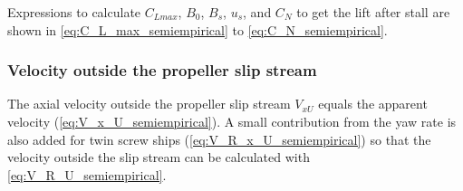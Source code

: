 Expressions to calculate $C_{Lmax}$, $B_0$, $B_s$, $u_s$, and $C_N$ to get the lift after stall are shown in \autoref{eq:C_L_max_semiempirical} to \autoref{eq:C_N_semiempirical}.
\begin{equation}
    \label{eq:C_L_max_semiempirical}
    
\end{equation}
%
\begin{equation}
    \label{eq:B_0_semiempirical}
    
\end{equation}
%
\begin{equation}
    \label{eq:B_s_semiempirical}
    
\end{equation}
%
\begin{equation}
    \label{eq:u_s_semiempirical}
    
\end{equation}
%
\begin{equation}
    \label{eq:C_N_semiempirical}
    
\end{equation}
%
%
\subsubsection{Velocity outside the propeller slip stream}
\label{sec:propeller_uncovered}
The axial velocity outside the propeller slip stream $V_{xU}$ equals the apparent velocity (\autoref{eq:V_x_U_semiempirical}). A small contribution from the yaw rate is also added for twin screw ships (\autoref{eq:V_R_x_U_semiempirical}) so that the velocity outside the slip stream can be calculated with \autoref{eq:V_R_U_semiempirical}.
\begin{equation}
    \label{eq:V_x_U_semiempirical}
    
\end{equation}
%
\begin{equation}
    \label{eq:V_R_x_U_semiempirical}
    
\end{equation}
%
\begin{equation}
    \label{eq:V_R_U_semiempirical}
    
\end{equation}
%
%
